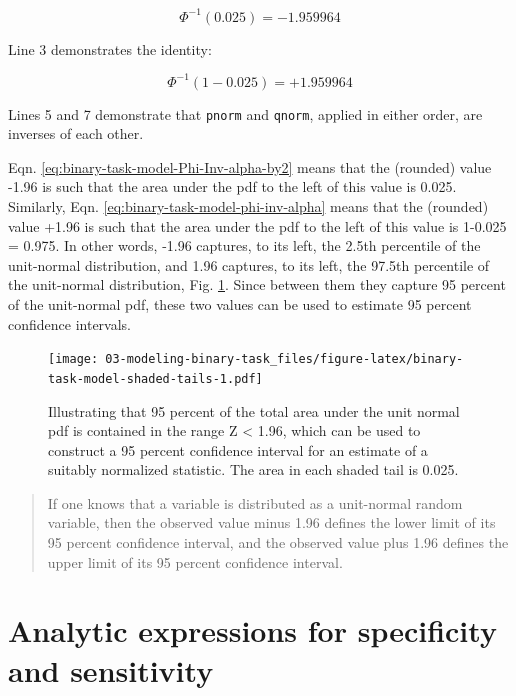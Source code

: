 \documentclass[
]{book}
\begin{document}
\begin{equation} 
\Phi^{-1}(0.025)=-1.959964
\label{eq:binary-task-model-Phi-Inv-alpha-by2}
\end{equation}

Line 3 demonstrates the identity:

\begin{equation} 
\Phi^{-1}(1-0.025)=+1.959964
\label{eq:binary-task-model-phi-inv-alpha}
\end{equation}

Lines 5 and 7 demonstrate that \texttt{pnorm} and \texttt{qnorm}, applied in either order, are inverses of each other.

Eqn. \eqref{eq:binary-task-model-Phi-Inv-alpha-by2} means that the (rounded) value -1.96 is such that the area under the pdf to the left of this value is 0.025. Similarly, Eqn. \eqref{eq:binary-task-model-phi-inv-alpha} means that the (rounded) value +1.96 is such that the area under the pdf to the left of this value is 1-0.025 = 0.975. In other words, -1.96 captures, to its left, the 2.5th percentile of the unit-normal distribution, and 1.96 captures, to its left, the 97.5th percentile of the unit-normal distribution, Fig. \ref{fig:binary-task-model-shaded-tails}. Since between them they capture 95 percent of the unit-normal pdf, these two values can be used to estimate 95 percent confidence intervals.

\begin{figure}
\centering
\texttt{[image: 03-modeling-binary-task\_files/figure-latex/binary-task-model-shaded-tails-1.pdf]}
\caption{\label{fig:binary-task-model-shaded-tails}Illustrating that 95 percent of the total area under the unit normal pdf is contained in the range \textbar Z\textbar{} \textless{} 1.96, which can be used to construct a 95 percent confidence interval for an estimate of a suitably normalized statistic. The area in each shaded tail is 0.025.}
\end{figure}

\begin{quote}
If one knows that a variable is distributed as a unit-normal random variable, then the observed value minus 1.96 defines the lower limit of its 95 percent confidence interval, and the observed value plus 1.96 defines the upper limit of its 95 percent confidence interval.
\end{quote}

\hypertarget{binary-task-model-sensitivity-specificity}{%
\section{Analytic expressions for specificity and sensitivity}\label{binary-task-model-sensitivity-specificity}}
\end{document}
